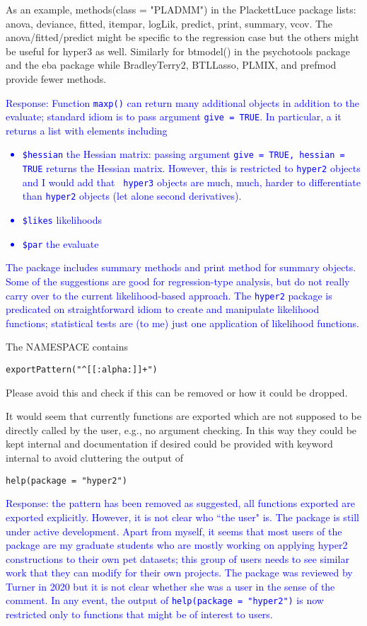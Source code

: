 \documentclass[12pt]{article}
\begin{document}
As an example, methods(class = "PLADMM") in the PlackettLuce package
lists: anova, deviance, fitted, itempar, logLik, predict, print,
summary, vcov. The anova/fitted/predict might be specific to the
regression case but the others might be useful for hyper3 as
well. Similarly for btmodel() in the psychotools package and the eba
package while BradleyTerry2, BTLLasso, PLMIX, and prefmod provide
fewer methods.

\textcolor{blue}{Response: Function {\tt maxp()} can return many
  additional objects in addition to the evaluate; standard idiom is to
  pass argument {\tt give = TRUE}.  In particular, a it returns a list with
  elements including
  \begin{itemize}
  \item {\tt \$hessian} the Hessian matrix: passing argument {\tt give
    = TRUE, hessian = TRUE} returns the Hessian matrix.  However, this
    is restricted to {\tt hyper2} objects and I would add that {\tt
      hyper3} objects are much, much, harder to differentiate than
    {\tt hyper2} objects (let alone second derivatives).
    \item {\tt \$likes} likelihoods
    \item {\tt \$par} the evaluate
  \end{itemize}
  The package includes summary methods and print method for summary
  objects.\\ Some of the suggestions are good for regression-type
  analysis, but do not really carry over to the current
  likelihood-based approach.  The {\tt hyper2} package is predicated
  on straightforward idiom to create and manipulate likelihood
  functions; statistical tests are (to me) just one application of
  likelihood functions.}

The NAMESPACE contains

\verb=exportPattern("^[[:alpha:]]+")=

Please avoid this and check if this can be removed or how it could be
dropped.

It would seem that currently functions are exported which are not
supposed to be directly called by the user, e.g., no argument
checking. In this way they could be kept internal and documentation if
desired could be provided with keyword internal to avoid cluttering
the output of

\verb+help(package = "hyper2")+

\textcolor{blue}{Response: the pattern has been removed as suggested,
  all functions exported are exported explicitly.  However, it is not
  clear who ``the user" is.  The package is still under active
  development.  Apart from myself, it seems that most users of the
  package are my graduate students who are mostly working on applying
  hyper2 constructions to their own pet datasets; this group of users
  needs to see similar work that they can modify for their own
  projects.  The package was reviewed by Turner in 2020 but it is not
  clear whether she was a user in the sense of the comment. In any
  event, the output of {\tt help(package = "hyper2")} is now
  restricted only to functions that might be of interest to users.  }
\end{document}
